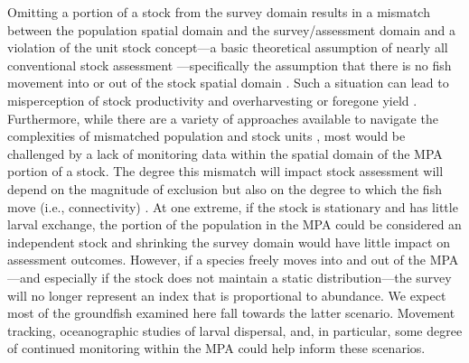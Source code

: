 \documentclass[12pt]{article}
\newcommand{\R}[1]{\label{#1}\linelabel{#1}}
\begin{document}
\begin{spacing}{1.4}
\R{B3}Omitting a portion of a stock from the survey domain results in a mismatch between the population spatial domain and the survey/assessment domain \citep{field2006} and a violation of the unit stock concept---a basic theoretical assumption of nearly all conventional stock assessment \citep{russell1931, cushing1968}---specifically the assumption that there is no fish movement into or out of the stock spatial domain \citep[e.g.,][]{cadrin2020}.
Such a situation can lead to misperception of stock productivity and overharvesting or foregone yield \citep[e.g.,][]{goethel2011, mcgilliard2015, kerr2017}.
Furthermore, while there are a variety of approaches available to navigate the complexities of mismatched population and stock units \citep{kerr2017}, most would be challenged by a lack of monitoring data within the spatial domain of the MPA portion of a stock.
The degree this mismatch will impact stock assessment will depend on the magnitude of exclusion but also on the degree to which the fish move (i.e., connectivity) \citep{field2006}.
At one extreme, if the stock is stationary and has little larval exchange, the portion of the population in the MPA could be considered an independent stock and shrinking the survey domain would have little impact on assessment outcomes.
However, if a species freely moves into and out of the MPA---and especially if the stock does not maintain a static distribution---the survey will no longer represent an index that is proportional to abundance.
We expect most of the groundfish examined here fall towards the latter scenario.
Movement tracking, oceanographic studies of larval dispersal, and, in particular, some degree of continued monitoring within the MPA could help inform these scenarios.






\end{spacing}
\end{document}
